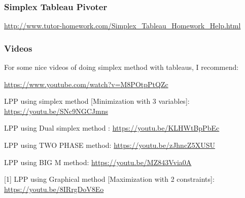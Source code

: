 %

\subsubsection{Simplex Tableau Pivoter}
\url{http://www.tutor-homework.com/Simplex_Tableau_Homework_Help.html}

\subsubsection{Videos}


For some nice videos of doing simplex method with tableaus, I recommend:

\url{https://www.youtube.com/watch?v=M8POtpPtQZc}

LPP using simplex method [Minimization with 3 variables]: \url{https://youtu.be/SNc9NGCJmns}

LPP using Dual simplex method : \url{https://youtu.be/KLHWtBpPbEc}

LPP using TWO PHASE method: \url{https://youtu.be/zJhncZ5XUSU}

LPP using BIG M method: \url{https://youtu.be/MZ843Vvia0A}

[1] LPP using Graphical method [Maximization with 2 constraints]: \url{https://youtu.be/8IRrgDoV8Eo}

